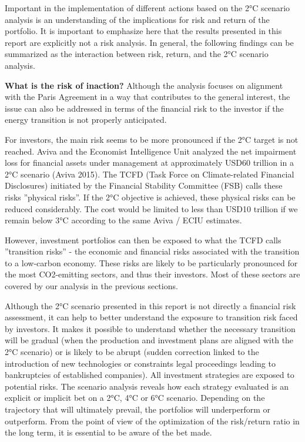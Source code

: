 \documentclass[10pt,table,a4]{article}\usepackage[]{graphicx}\usepackage[]{color}
\begin{document}
		\begin{multicols}{2}
				Important in the implementation of different actions based on the 2°C scenario analysis is an understanding of the implications for risk and return of the portfolio. It is important to emphasize here that the results presented in this report are explicitly not a risk analysis. In general, the following findings can be summarized as the interaction between risk, return, and the 2°C scenario analysis. 
			
			\textbf{What is the risk of inaction?}
			Although the analysis focuses on alignment with the Paris Agreement in a way that contributes to the general interest, the issue can also be addressed in terms of the financial risk to the investor if the energy transition is not properly anticipated. 
			
			For investors, the main risk seems to be more pronounced if the 2°C target is not reached. Aviva and the Economist Intelligence Unit analyzed the net impairment loss for financial assets under management at approximately USD60 trillion in a 2°C scenario (Aviva 2015). The TCFD (Task Force on Climate-related Financial Disclosures) initiated by the Financial Stability Committee (FSB) calls these risks ”physical risks”. If the 2°C objective is achieved, these physical risks can be reduced considerably. The cost would be limited to less than USD10 trillion if we remain below 3°C according to the same Aviva / ECIU estimates. 
			
			However, investment portfolios can then be exposed to what the TCFD calls ”transition risks” - the economic and financial risks associated with the transition to a low-carbon economy. These risks are likely to be particularly pronounced for the most CO2-emitting sectors, and thus their investors. Most of these sectors are covered by our analysis in the previous sections. 
			
			Although the 2°C scenario presented in this report is not directly a financial risk assessment, it can help to better understand the exposure to transition risk faced by investors. It makes it possible to understand whether the necessary transition will be gradual (when the production and investment plans are aligned with the 2°C scenario) or is likely to be abrupt (sudden correction linked to the introduction of new technologies or constraints legal proceedings leading to bankruptcies of established companies). All investment strategies are exposed to potential risks. The scenario analysis reveals how each strategy evaluated is an explicit or implicit bet on a 2°C, 4°C or 6°C scenario. Depending on the trajectory that will ultimately prevail, the portfolios will underperform or outperform. From the point of view of the optimization of the risk/return ratio in the long term, it is essential to be aware of the bet made.
			

\end{multicols}
\end{document}
